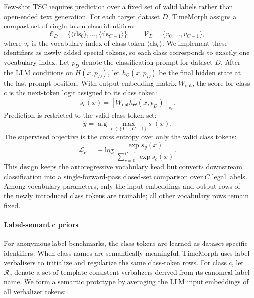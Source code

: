 \documentclass[10pt,journal,compsoc]{IEEEtran}
\begin{document}
Few-shot TSC requires prediction over a fixed set of valid labels rather than open-ended text generation.
For each target dataset $D$, TimeMorph assigns a compact set of single-token class identifiers:
\begin{equation}
\label{eq:class-token-set}
\mathcal{C}_D
=
\{
\langle \mathrm{cls}_0\rangle,\ldots,\langle \mathrm{cls}_{C-1}\rangle
\},
\qquad
\mathcal{V}_D
=
\{
v_0,\ldots,v_{C-1}
\},
\end{equation}
where $v_c$ is the vocabulary index of class token $\langle \mathrm{cls}_c\rangle$.
We implement these identifiers as newly added special tokens, so each class corresponds to exactly one vocabulary index.
Let $p_D$ denote the classification prompt for dataset $D$.
After the LLM conditions on $H(x,p_D)$, let $h_{\Theta}(x,p_D)$ be the final hidden state at the last prompt position.
With output embedding matrix $W_{\mathrm{out}}$, the score for class $c$ is the next-token logit assigned to its class token:
\begin{equation}
\label{eq:class-score}
s_c(x)
=
\left[
W_{\mathrm{out}}h_{\Theta}(x,p_D)
\right]_{v_c}.
\end{equation}
Prediction is restricted to the valid class-token set:
\begin{equation}
\label{eq:class-pred}
\hat{y}
=
\arg\max_{c\in\{0,\ldots,C-1\}} s_c(x).
\end{equation}
The supervised objective is the cross entropy over only the valid class tokens:
\begin{equation}
\label{eq:class-token-loss}
\mathcal{L}_{\mathrm{ct}}
=
-\log
\frac{\exp s_y(x)}
{\sum_{c=0}^{C-1}\exp s_c(x)}.
\end{equation}
This design keeps the autoregressive vocabulary head but converts downstream classification into a single-forward-pass closed-set comparison over $C$ legal labels.
Among vocabulary parameters, only the input embeddings and output rows of the newly introduced class tokens are trainable; all other vocabulary rows remain fixed.

\paragraph{Label-semantic priors}
For anonymous-label benchmarks, the class tokens are learned as dataset-specific identifiers.
When class names are semantically meaningful, TimeMorph uses label verbalizers to initialize and regularize the same class-token rows.
For class $c$, let $\mathcal{R}_c$ denote a set of template-consistent verbalizers derived from its canonical label name.
We form a semantic prototype by averaging the LLM input embeddings of all verbalizer tokens:
\end{document}
